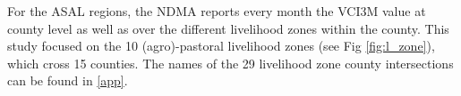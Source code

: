 \documentclass[review]{elsarticle}
\begin{document}


{\color{blue}For the ASAL regions, the NDMA reports every month the VCI3M value at county level as well as over the different livelihood zones within the county.} This study focused on the 10 (agro)-pastoral livelihood zones (see Fig \ref{fig:l_zone}), which cross 15 counties. The names of the 29 livelihood zone county intersections can be found in \ref{app}. 






\end{document}
